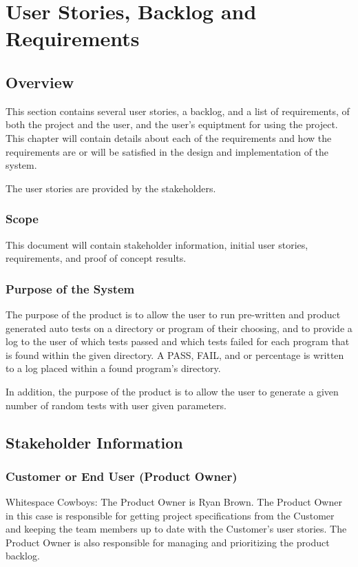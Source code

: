 \chapter{User Stories, Backlog and Requirements}
\section{Overview}
This section contains several user stories, a backlog, and a list of requirements, of
both the project and the user, and the user's equiptment for using the project. This
chapter will contain 
details about each of the requirements and how the requirements are or will be 
satisfied in the design and implementation of the system.

The user stories are provided by the stakeholders.

\subsection{Scope}

This document will contain stakeholder information, initial user stories, requirements, and 
proof of concept results.



\subsection{Purpose of the System}
The purpose of the product is to allow the user to run pre-written and product generated auto tests on a directory or 
program of their choosing, and to provide a log to the user of which tests passed and which tests failed for each program 
that is found within the given directory. A PASS, FAIL, and or percentage is written to a log placed within a found 
program's directory. 

In addition, the purpose of the product is to allow the user to generate a given number of random 
tests with user given parameters.

\section{ Stakeholder Information}


\subsection{Customer or End User (Product Owner)}
Whitespace Cowboys:
The Product Owner is Ryan Brown. The Product Owner in this case is responsible for 
getting project specifications from the Customer and keeping the team members up to date 
with the Customer's user stories. The Product Owner is also responsible for managing and 
prioritizing the product backlog.

